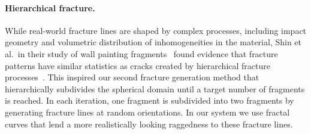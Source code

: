 \documentclass[acmlarge,screen,dvipsnames]{acmart}
\begin{document}
\paragraph{Hierarchical fracture.}
%
While real-world fracture lines are shaped by complex processes,
including impact geometry and volumetric distribution of
inhomogeneities in the material, Shin et al.\ in their study of
wall painting fragments~\cite{Shin:2012:ASF:2362402.2362404} found
evidence that fracture patterns have similar statistics as cracks
created by hierarchical fracture
processes~\cite{Bohn:2005:Four}.
%
This inspired our second fracture generation method that
hierarchically subdivides the spherical domain until a target number
of fragments is reached. In each iteration, one fragment is subdivided into 
two fragments by generating fracture lines at random orientations. 
%
In our system we use fractal curves that lend a more realistically
looking raggedness to these fracture lines.
\end{document}
